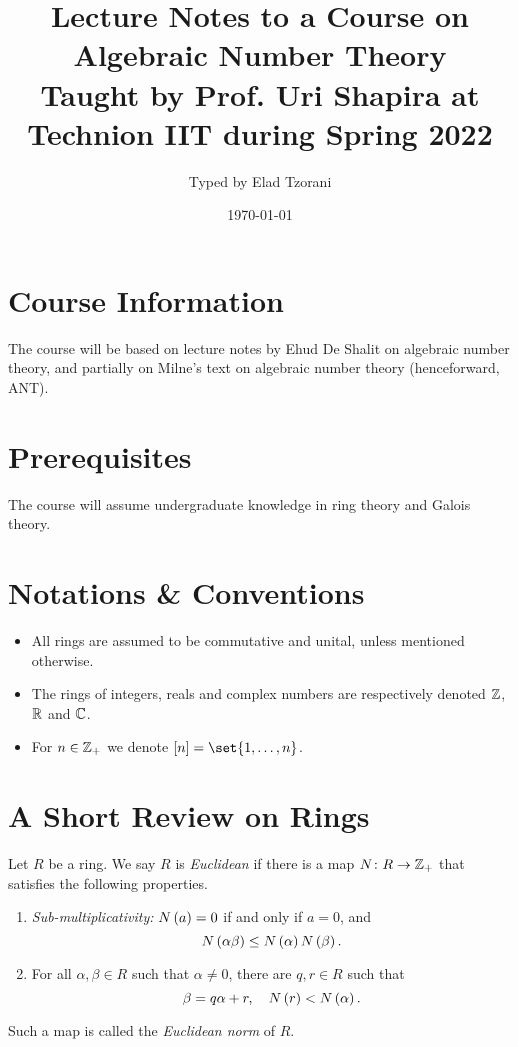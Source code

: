 \documentclass[11pt]{karticle}
\title{Lecture Notes to a Course on Algebraic Number Theory \\ \small{Taught by Prof. Uri Shapira at Technion IIT during Spring 2022}}
\author{Typed by Elad Tzorani}
\date{\today}
\begin{document}
\maketitle


\section*{Course Information}

The course will be based on lecture notes by Ehud De Shalit on algebraic number theory, and partially on Milne's text on algebraic number theory (henceforward, ANT).

\section*{Prerequisites}

The course will assume undergraduate knowledge in ring theory and Galois theory.

\section{Notations \& Conventions}


\begin{itemize}
\item All rings are assumed to be commutative and unital, unless mentioned otherwise. 
\item The rings of integers, reals and complex numbers are respectively denoted $\mathbb{Z}$, $\mathbb{R}$ and $\mathbb{C}$.
\item For $n \in \mathbb{Z}_+$ we denote $\brs{n} = \set{1, \ldots, n}$.
\end{itemize}

\section{A Short Review on Rings}

\begin{definition}
Let $R$ be a ring. We say $R$ is \emph{Euclidean} if there is a map $N \colon R \to \mathbb{Z}_+$ that satisfies the following properties.

\begin{enumerate}[label = (\roman*)]
\item \emph{Sub-multiplicativity:} $N\left( a \right) = 0$ if and only if $a=0$, and
\[N\left( \alpha \beta \right) \leq N\left( \alpha \right) N\left( \beta \right) \text{.}\]
\item For all $\alpha,\beta \in R$ such that $\alpha \neq 0$, there are $q,r \in R$ such that
\[\beta = q \alpha + r, \quad N\left( r \right) < N\left( \alpha \right) \text{.}\]
\end{enumerate}

Such a map is called the \emph{Euclidean norm} of $R$.
\end{definition}
\end{document}
